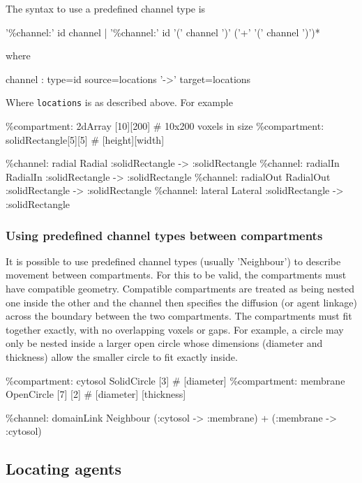 The syntax to use a predefined channel type is

\begin{bnfsource}
'\%channel:' id channel
| '\%channel:' id '(' channel ')' ('+' '(' channel ')')*
\end{bnfsource}
where
\begin{bnfsource}
channel :
  type=id source=locations '->' target=locations
\end{bnfsource}
Where \verb|locations| is as described above. For example
\begin{kappasource}
\%compartment: 2dArray [10][200]    # 10x200 voxels in size 
\%compartment: solidRectangle[5][5] # [height][width]

\%channel: radial Radial :solidRectangle -> :solidRectangle
\%channel: radialIn RadialIn :solidRectangle -> :solidRectangle
\%channel: radialOut RadialOut :solidRectangle -> :solidRectangle
\%channel: lateral Lateral :solidRectangle -> :solidRectangle
\end{kappasource}

\subsubsection{Using predefined channel types between compartments}

It is possible to use predefined channel types (usually 'Neighbour') to describe movement between compartments. For this to be valid, the compartments must have compatible geometry. Compatible compartments are treated as being nested one inside the other and the channel then specifies the diffusion (or agent linkage) across the boundary between the two compartments. The compartments must fit together exactly, with no overlapping voxels or gaps. For example, a circle may only be nested inside a larger open circle whose dimensions (diameter and thickness) allow the smaller circle to fit exactly inside.

\begin{kappasource}
\%compartment: cytosol   SolidCircle   [3]           # [diameter]
\%compartment: membrane  OpenCircle    [7] [2]       # [diameter] [thickness]

\%channel: domainLink Neighbour (:cytosol -> :membrane) + (:membrane -> :cytosol)
\end{kappasource}


\subsection{Locating agents}

